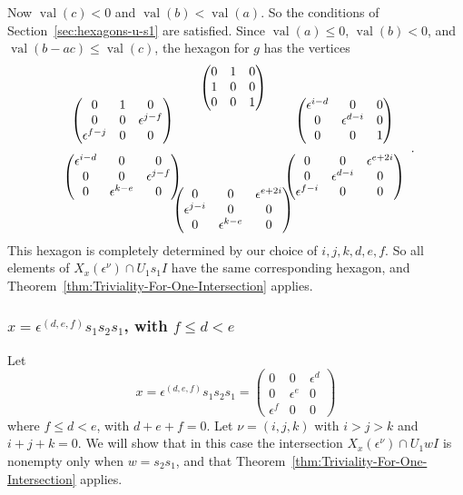 \documentclass{amsart}
\theoremstyle{definition}
\def\e{\epsilon}
\def\val{\mathop{\mathrm{val}}}
\def\en{\e^{\nu}}
\def\X{X_x(\en)}
\def\heximages#1#2#3#4#5#6{
  \heximagessqueezedcarefully{1.7em}{-1em}{#1}{#2}{#3}{#4}{#5}{#6}
}
\def\heximagessqueezedcarefully#1#2#3#4#5#6#7#8{
  \begin{array}{ccc}
    & #3 & \\[#2]
    #5 \hspace{-#1} & & \hspace{-#1} #4 \\[2em]
    #6 \hspace{-#1} & & \hspace{-#1} #7 \\[#2]
    & #8 &
  \end{array}
}
\begin{document}
  Now $\val(c) < 0$ and $\val(b) < \val(a)$. So the conditions of
  Section~\ref{sec:hexagons-u-s1} are satisfied.  Since $\val(a) \le 0$,
  $\val(b) < 0$, and $\val(b-ac) \le \val(c)$, the hexagon for $g$ has the
  vertices
  \begin{equation*}
    \heximages
	{\begin{pmatrix}
	    0 & 1 & 0 \\
	    1 & 0 & 0 \\
	    0 & 0 & 1
	\end{pmatrix}}
	{\begin{pmatrix}
	    \e^{i-d} & 0 & 0 \\
	    0 & \e^{d-i} & 0 \\
	    0 & 0 & 1
	\end{pmatrix}}
	{\begin{pmatrix}
	    0 & 1 & 0 \\
	    0 & 0 & \e^{j-f} \\
	    \e^{f-j} & 0 & 0
	\end{pmatrix}}
	{\begin{pmatrix}
	    \e^{i-d} & 0 & 0 \\
	    0 & 0 & \e^{j-f} \\
	    0 & \e^{k-e} & 0
	\end{pmatrix}}
	{\begin{pmatrix}
	    0 & 0 & \e^{e+2i} \\
	    0 & \e^{d-i} & 0 \\
	    \e^{f - i} & 0 & 0
	\end{pmatrix}}
	{\begin{pmatrix}
	    0 & 0 & \e^{e+2i} \\
	    \e^{j-i} & 0 & 0 \\
	    0 & \e^{k-e} & 0
	\end{pmatrix}}.
  \end{equation*}
  This hexagon is completely determined by our choice of $i,j,k,d,e,f$.  So all
  elements of $\X \cap U_1 s_1 I$ have the same corresponding hexagon, and
  Theorem~\ref{thm:Triviality-For-One-Intersection} applies.

  \subsubsection{$x = \e^{(d, e, f)}s_1s_2s_1$, with $f \le d < e$}
  Let
  \begin{equation}
    x = \e^{(d, e, f)}s_1 s_2 s_1 = \begin{pmatrix}
        0 & 0 & \e^d \\
        0 & \e^e & 0 \\
        \e^f & 0 & 0
      \end{pmatrix}
  \end{equation}
  where $f \le d < e$, with $d + e + f = 0$.  Let $\nu = (i,j,k)$ with $i > j >
  k$ and $i + j + k = 0$.  We will show that in this case the intersection $\X
  \cap U_1 wI$ is nonempty only when $w = s_2 s_1$, and that
  Theorem~\ref{thm:Triviality-For-One-Intersection} applies.
\end{document}
